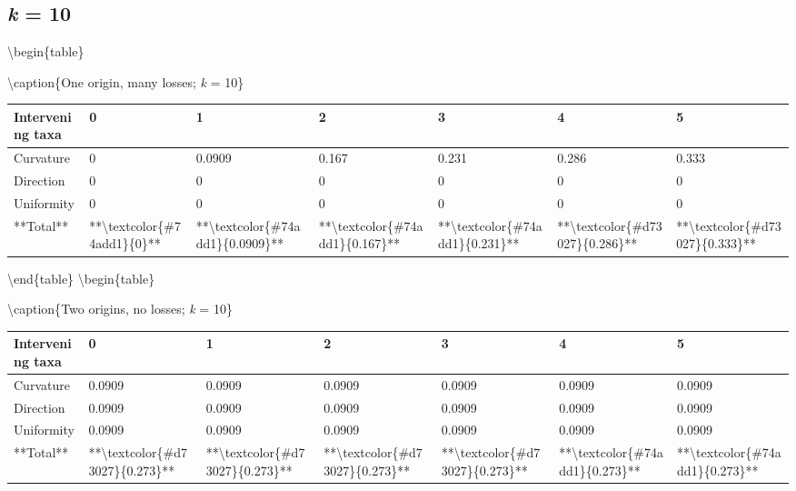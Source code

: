\documentclass[]{book}
\theoremstyle{definition}
\theoremstyle{definition}
\theoremstyle{definition}
\theoremstyle{remark}
\begin{document}
\hypertarget{k-10}{%
\subsection{\texorpdfstring{\emph{k} = 10}{k = 10}}\label{k-10}}

\textbackslash{}begin\{table\}

\textbackslash{}caption\{\label{tab:unnamed-chunk-73}One origin, many
losses; \emph{k} = 10\} \centering

\begin{tabular}[t]{l|l|l|l|l|l|l}
\hline
Intervening taxa & 0 & 1 & 2 & 3 & 4 & 5\\
\hline
Curvature & 0 & 0.0909 & 0.167 & 0.231 & 0.286 & 0.333\\
\hline
Direction & 0 & 0 & 0 & 0 & 0 & 0\\
\hline
Uniformity & 0 & 0 & 0 & 0 & 0 & 0\\
\hline
**Total** & **\textbackslash{}textcolor\{\#74add1\}\{0\}** & **\textbackslash{}textcolor\{\#74add1\}\{0.0909\}** & **\textbackslash{}textcolor\{\#74add1\}\{0.167\}** & **\textbackslash{}textcolor\{\#74add1\}\{0.231\}** & **\textbackslash{}textcolor\{\#d73027\}\{0.286\}** & **\textbackslash{}textcolor\{\#d73027\}\{0.333\}**\\
\hline
\end{tabular}

\textbackslash{}end\{table\} \textbackslash{}begin\{table\}

\textbackslash{}caption\{\label{tab:unnamed-chunk-74}Two origins, no losses;
\emph{k} = 10\} \centering

\begin{tabular}[t]{l|l|l|l|l|l|l}
\hline
Intervening taxa & 0 & 1 & 2 & 3 & 4 & 5\\
\hline
Curvature & 0.0909 & 0.0909 & 0.0909 & 0.0909 & 0.0909 & 0.0909\\
\hline
Direction & 0.0909 & 0.0909 & 0.0909 & 0.0909 & 0.0909 & 0.0909\\
\hline
Uniformity & 0.0909 & 0.0909 & 0.0909 & 0.0909 & 0.0909 & 0.0909\\
\hline
**Total** & **\textbackslash{}textcolor\{\#d73027\}\{0.273\}** & **\textbackslash{}textcolor\{\#d73027\}\{0.273\}** & **\textbackslash{}textcolor\{\#d73027\}\{0.273\}** & **\textbackslash{}textcolor\{\#d73027\}\{0.273\}** & **\textbackslash{}textcolor\{\#74add1\}\{0.273\}** & **\textbackslash{}textcolor\{\#74add1\}\{0.273\}**\\
\hline
\end{tabular}
\end{document}
